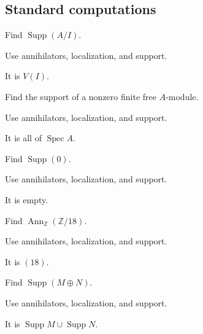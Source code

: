 \subsection*{Standard computations}

\begin{exercise}\label{exr:v16-expand-01}
Find $\operatorname{Supp}(A/I)$.
\end{exercise}
\begin{hint}
Use annihilators, localization, and support.
\end{hint}
\begin{solution}
It is $V(I)$.
\end{solution}

\begin{exercise}\label{exr:v16-expand-02}
Find the support of a nonzero finite free $A$-module.
\end{exercise}
\begin{hint}
Use annihilators, localization, and support.
\end{hint}
\begin{solution}
It is all of $\operatorname{Spec}A$.
\end{solution}

\begin{exercise}\label{exr:v16-expand-03}
Find $\operatorname{Supp}(0)$.
\end{exercise}
\begin{hint}
Use annihilators, localization, and support.
\end{hint}
\begin{solution}
It is empty.
\end{solution}

\begin{exercise}[Annihilator]\label{exr:v16-expand-04}
Find $\operatorname{Ann}_{\mathbb Z}(\mathbb Z/18)$.
\end{exercise}
\begin{hint}
Use annihilators, localization, and support.
\end{hint}
\begin{solution}
It is $(18)$.
\end{solution}

\begin{exercise}\label{exr:v16-expand-05}
Find $\operatorname{Supp}(M\oplus N)$.
\end{exercise}
\begin{hint}
Use annihilators, localization, and support.
\end{hint}
\begin{solution}
It is $\operatorname{Supp}M\cup\operatorname{Supp}N$.
\end{solution}

